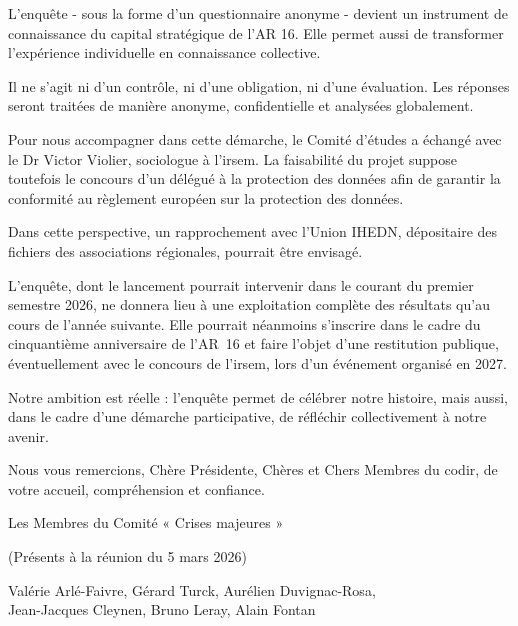 \begin{tcolorbox}[
breakable,
colback=gray!5,
colframe=black,
boxrule=0.5pt,
arc=3mm
]
L'enquête - sous la forme d'un questionnaire anonyme - devient un instrument de connaissance du capital stratégique de l'AR 16. Elle permet aussi de transformer l'expérience individuelle en connaissance collective.

Il ne s'agit ni d'un contrôle, ni d'une obligation, ni d'une évaluation. Les réponses seront traitées de manière anonyme, confidentielle et analysées globalement.

Pour nous accompagner dans cette démarche, le Comité d'études a échangé avec le Dr Victor Violier, sociologue à l'\gls{irsem}. La faisabilité du projet suppose toutefois le concours d'un délégué à la protection des données afin de garantir la conformité au règlement européen sur la protection des données.

Dans cette perspective, un rapprochement avec l'Union IHEDN, dépositaire des fichiers des associations régionales, pourrait être envisagé.

L'enquête, dont le lancement pourrait intervenir dans le courant du premier semestre 2026, ne donnera lieu à une exploitation complète des résultats qu'au cours de l'année suivante. Elle pourrait néanmoins s'inscrire dans le cadre du cinquantième anniversaire de l'AR~16 et faire l'objet d'une restitution publique, éventuellement avec le concours de l'\gls{irsem}, lors d'un événement organisé en 2027.

Notre ambition est réelle : l'enquête permet de célébrer notre histoire, mais aussi, dans le cadre d'une démarche participative, de réfléchir collectivement à notre avenir.

Nous vous remercions, Chère Présidente, Chères et Chers Membres du \acrshort{codir}, de votre accueil, compréhension et confiance.

\begin{flushright}
Les Membres du Comité « Crises majeures »

(Présents à la réunion du 5 mars 2026)

Valérie Arlé-Faivre, Gérard Turck, Aurélien Duvignac-Rosa,\\
Jean-Jacques Cleynen, Bruno Leray, Alain Fontan
\end{flushright}

\end{tcolorbox}